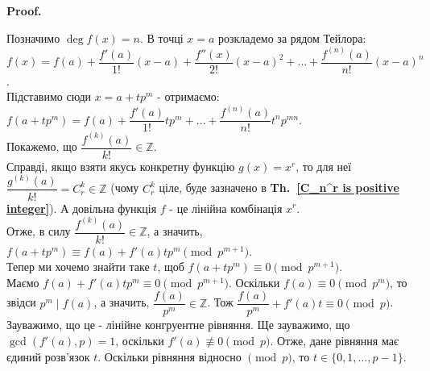 \documentclass[a4paper, 14pt]{extarticle}
\makeatletter
\theoremstyle{theoremdd}
\theoremstyle{theoremdd}
\theoremstyle{theoremdd}
\theoremstyle{theoremdd}
\theoremstyle{theoremdd}
\newtheorem{proposition}[theorem]{Proposition}
\theoremstyle{theoremdd}
\theoremstyle{theoremdd}
\theoremstyle{theoremdd}
\def\qed{$\blacksquare$}
\renewenvironment{proof}[1][Proof.\\]{\par
\pushQED{\hfill \qed}%
\normalfont \topsep6\p@\@plus6\p@\relax
\trivlist
\item\relax
{\bfseries
#1\@addpunct{.}}\hspace\labelsep\ignorespaces
}{%
\popQED\endtrivlist\@endpefalse
}
\newcommand\thref[1]{\textbf{Th.~\ref{#1}}}
\makeatother
\begin{document}
\begin{proof}
Позначимо $\deg f(x) = n$. В точці $x = a$ розкладемо за рядом Тейлора:\\
$f(x) = f(a) + \dfrac{f'(a)}{1!}(x-a) + \dfrac{f''(x)}{2!}(x-a)^2 + \dots + \dfrac{f^{(n)}(a)}{n!}(x-a)^n$.\\
Підставимо сюди $x = a+tp^m$ - отримаємо:\\
$f(a+tp^m) = f(a) + \dfrac{f'(a)}{1!}tp^m + \dots + \dfrac{f^{(n)}(a)}{n!}t^n p^{mn}$.\\
Покажемо, що $\dfrac{f^{(k)}(a)}{k!} \in \mathbb{Z}$. \\
Справді, якщо взяти якусь конкретну функцію $g(x) = x^r$, то для неї $\dfrac{g^{(k)}(a)}{k!} = C_r^k \in \mathbb{Z}$ (чому $C_r^k$ ціле, буде зазначено в \thref{C_n^r is positive integer}). А довільна функція $f$ - це лінійна комбінація $x^r$.\\
Отже, в силу $\dfrac{f^{(k)}(a)}{k!} \in \mathbb{Z}$, а значить, $f(a+tp^m) \equiv f(a)+f'(a)tp^m \pmod {p^{m+1}}$.\\
Тепер ми хочемо знайти таке $t$, щоб $f(a+tp^m) \equiv 0 \pmod {p^{m+1}}$.\\
Маємо $f(a) + f'(a)tp^m \equiv 0 \pmod {p^{m+1}}$. Оскільки $f(a) \equiv 0 \pmod {p^m}$, то звідси $p^m \mid f(a)$, а значить, $\dfrac{f(a)}{p^m} \in \mathbb{Z}$. Тож $\dfrac{f(a)}{p^m} + f'(a)t \equiv 0 \pmod p$.\\
Зауважимо, що це - лінійне конгруентне рівняння. Ще зауважимо, що $\gcd(f'(a),p) = 1$, оскільки $f'(a) \not\equiv 0 \pmod {p}$. Отже, дане рівняння має єдиний розв'язок $t$. Оскільки рівняння відносно $\pmod p$, то $t \in \{0,1,\dots,p-1\}$.
\end{proof}

\iffalse
\begin{proposition}
Задано функцію $f \in \mathbb{Z}[x]$ та $p$ - просте число.\\
Нехай $f(a) \not\equiv 0 \pmod {p^m}$. Тоді $\forall t \in \{0,1,\dots,p-1\}: f(a+tp^m) \not\equiv 0 \pmod {p^{m+1}}$.\\
\textit{Можливо, зайве твердження. Але завдяки цьому, можна зрозуміти, чому певні числа не будуть коренями.}
\end{proposition}

\begin{proof}
!Припустимо, що $\exists t: f(a+tp^m) \equiv 0 \pmod {p^{m+1}}$. Звідси випливає, що $\exists t: f(a+tp^m) \equiv 0 \pmod {p^{m}}$.\\
$f(a+tp^m) = c_0 + c_1 (a+tp^m) + c_2 (a+tp^m)^2 + \dots + c_k (a+tp^m)^k \equiv c_0 + c_1a + c_2a^2 + \dots + c_ka^k = f(a) \equiv 0 \pmod {p^m}$. Суперечність!
\end{proof}
\fi
\end{document}
